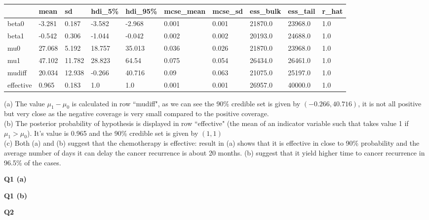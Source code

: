 \documentclass{homeworg}
\begin{document}
\begin{table}[h]
	\begin{tabular}{llllllllll}
		\hline\hline
		& mean    & sd     & hdi\_5\% & hdi\_95\% & mcse\_mean & mcse\_sd & ess\_bulk & ess\_tail & r\_hat \\ \hline
		   beta0                    & -3.281  & 0.187  & -3.582 & -2.968  & 0.001 & 0.001 & 21870.0 & 23968.0 & 1.0 \\
		   beta1                    & -0.542  & 0.306  & -1.044 & -0.042  & 0.002 & 0.002 & 20193.0 & 24688.0 & 1.0 \\
		   mu0                  & 27.068  & 5.192  & 18.757 & 35.013  & 0.036 & 0.026 & 21870.0 & 23968.0 & 1.0 \\
		   mu1                  & 47.102  & 11.782 & 28.823 & 64.54   & 0.075 & 0.054 & 26434.0 & 26461.0 & 1.0 \\
		   mudiff                   & 20.034  & 12.938 & -0.266 & 40.716  & 0.09  & 0.063 & 21075.0 & 25197.0 & 1.0 \\
		   effective                & 0.965   & 0.183  & 1.0    & 1.0     & 0.001 & 0.001 & 26957.0 & 40000.0 & 1.0
		\\ \hline\hline
	\end{tabular}
\end{table}

(a) The value $\mu_1-\mu_0$ is calculated in row ``mudiff", as we can see the 90\% credible set is given by $(-0.266,40.716)$, it is not all positive but very close as the negative coverage is very small compared to the positive coverage. \\

(b) The posterior probability of hypothesis is displayed in row ``effective" (the mean of an indicator variable such that takes value 1 if $\mu_1>\mu_0$). It's value is 0.965 and the 90\% credible set is given by $(1,1)$\\

(c) Both (a) and (b) suggest that the chemotherapy is effective: result in (a) shows that it is effective in close to 90\% probability  and the average number of days it can delay the cancer recurrence is about 20 months. (b) suggest that it yield higher time to cancer recurrence in 96.5\% of the cases. 

%
%

\newpage
\textbf{Q1 (a)}


\newpage
\textbf{Q1 (b)}


\newpage
\textbf{Q2}

%
\end{document}
